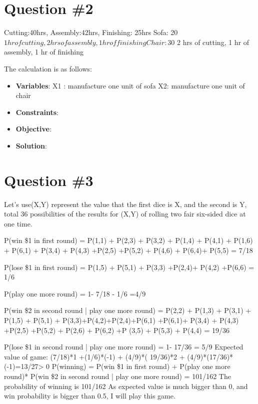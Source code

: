 \documentclass[conference]{styles/acmsiggraph}
\begin{document}
\section{Question \#2}

Cutting:40hrs, Assembly:42hrs, Finishing: 25hrs
Sofa: 20$ 1hr of cutting, 2hrs of assembly, 1 hr of finishing  
Chair: 30$ 2 hrs of cutting, 1 hr of assembly, 1 hr of finishing

The calculation is as follows:
\begin{itemize}[leftmargin=*]
	\setlength{\itemsep}{0pt}
	\setlength{\parsep}{0pt}
	\setlength{\parskip}{0pt}
	\item \textbf{Variables}: X1 : manufacture one unit of sofa  X2: manufacture one unit of chair
	\item \textbf{Constraints}: 
	\item \textbf{Objective}:
	\item \textbf{Solution}:
\end{itemize}


\section{Question \#3}

Let's use(X,Y) represent the value that the first dice is X, and the second is Y, total 36 possibilities of the results for (X,Y) of rolling two fair six-sided dice at one time.

P(win \$1 in first round) = P(1,1) + P(2,3) + P(3,2) + P(1,4) + P(4,1) + P(1,6) + P(6,1) + P(3,4) + P(4,3) +P(2,5) +P(5,2) + P(4,6) + P(6,4)+ P(5,5) = 7/18

P(lose \$1 in first round) = P(1,5) + P(5,1) + P(3,3) +P(2,4)+ P(4,2) +P(6,6) = 1/6

P(play one more round) = 1- 7/18 - 1/6 =4/9

P(win \$2 in second round | play one more round) = P(2,2) + P(1,3) + P(3,1) + P(1,5) + P(5,1) + P(3,3)+P(4,2)+P(2,4)+P(6,1) +P(6,1)+ P(3,4) + P(4,3) +P(2,5) +P(5,2) + P(2,6) + P(6,2) +P (3,5) + P(5,3) + P(4,4) = 19/36

P(lose \$1 in second round | play one more round) = 1- 17/36 = 5/9 
Expected value of game: (7/18)*1 +(1/6)*(-1) + (4/9)*( 19/36)*2 + (4/9)*(17/36)*(-1)=13/27> 0
P(winning) = P(win \$1 in first round) + P(play one more round)* P(win \$2 in second round | play one more round) = 101/162
The probability of winning is 101/162
As expected value is much bigger than 0, and win probability is bigger than 0.5, I will play this game.
\end{document}
